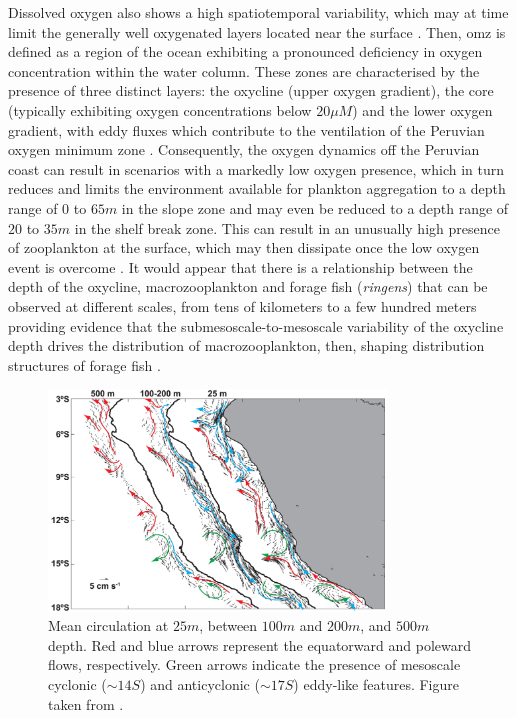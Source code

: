 Dissolved oxygen also shows a high spatiotemporal variability, which may at time limit the generally well oxygenated layers located near the surface \citep{EspiEche2017,EspiEche2019}. Then, \acrlong{omz} is defined as a region of the ocean exhibiting a pronounced deficiency in oxygen concentration within the water column. These zones are characterised by the presence of three distinct layers: the oxycline (upper oxygen gradient), the core (typically exhibiting oxygen concentrations below $20 \mu M$) and the lower oxygen gradient, with eddy fluxes which contribute to the ventilation of the Peruvian oxygen minimum zone \citep{BettLope2015}. Consequently, the oxygen dynamics off the Peruvian coast can result in scenarios with a markedly low oxygen presence, which in turn reduces and limits the environment available for plankton aggregation to a depth range of $0$ to $65 m$ in the slope zone and may even be reduced to a depth range of $20$ to $35 m$ in the shelf break zone. This can result in an unusually high presence of zooplankton at the surface, which may then dissipate once the low oxygen event is overcome \citep{Judk1980}. It would appear that there is a relationship between the depth of the oxycline, macrozooplankton and forage fish (\textit{\gls{ringens}}) that can be observed at different scales, from tens of kilometers to a few hundred meters providing evidence that the submesoscale-to-mesoscale variability of the oxycline depth drives the distribution of macrozooplankton, then, shaping distribution structures of forage fish \citep{GradFabl2012,GradBert2016}.\\

\begin{figure}[H]
	\includegraphics[width=0.8\textwidth]{figures/Chap1MeanCirculationNHCS.png}
	\centering
	\caption{Mean circulation at $25m$, between $100m$ and $200m$, and $500m$ depth. Red and blue arrows represent the equatorward and poleward flows, respectively. Green arrows indicate the presence of mesoscale cyclonic ($\sim 14$\textdegree $S$) and anticyclonic ($\sim 17$\textdegree $S$) eddy-like features. Figure taken from \cite{ChaiDomi2013}.}
	\label{Chap1MeanCirculationNHCS}
\end{figure}


